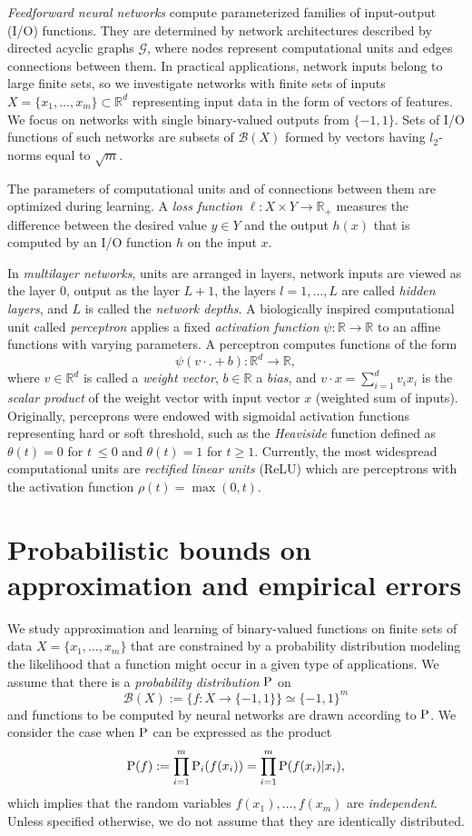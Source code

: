 \documentclass{elsarticle}
\def\n{\noindent}
\def\P{{\rm P}}
\def\cG{{\mathcal G}}
\def\cB{{\mathcal B}}
\def\bR{{\mathbb R}}
\def\n{\noindent}
\begin{document}
{\em Feedforward neural networks} compute parameterized families of input-output (I/O) functions.  They are  determined by network architectures described by directed acyclic graphs $\cG$, where nodes represent computational units and edges connections between them. In practical applications, network inputs belong to large finite sets, so we investigate networks with finite sets of inputs $X =\{x_1, \dots, x_m\}  \subset \bR^d$ representing input data in the form of vectors of features. We focus on networks with single binary-valued outputs from $\{-1,1\}$.
Sets of I/O functions of such networks are subsets of $\cB(X)$ formed by vectors having $l_2$-norms equal to $\sqrt{m}$.

The parameters of computational units and of connections between them are optimized during learning.
A {\em loss function} $\ell: X \times Y \to \bR_+$  measures the difference between the desired value $y \in Y$ and the output $h(x)$ that is computed  by an I/O function $h$ on the input $x$.

In {\em multilayer networks}, units are arranged in layers, network inputs are viewed as the layer $0$, output as the layer $L+1$,  the layers $l=1, \dots, L$ are called {\em hidden layers}, and $L$ is called the {\em network depths}.
A biologically inspired computational unit called {\em perceptron}  applies  a fixed {\em activation function}  $\psi: \bR \to \bR$ to an affine functions with varying parameters. A perceptron computes functions of the form
$$\psi(v \cdot . +b): \bR^d \to \bR,$$
\n where $v \in \bR^d$ is called a {\em weight vector}, $b \in \bR$ a {\em bias}, and $v \cdot x = \sum_{i=1}^d v_i x_i$ is the {\em scalar product} of the weight vector with input vector $x$ (weighted sum of inputs). Originally, perceprons were endowed with sigmoidal activation functions representing hard or soft threshold, such as the {\em Heaviside} function defined as  $\theta(t) = 0$ for $t\ \le 0$ and $\theta(t) =1$ for $t \geq 1$. Currently, the most widespread computational units are {\em rectified linear units} (ReLU) which are perceptrons with the activation function $\rho(t) = \max(0,t)$.


\section{Probabilistic bounds on approximation and empirical errors}
\label{sec:prob}

We study approximation and learning of binary-valued functions on finite sets of data $X = \{x_1, \dots, x_m\}$ that are constrained by a probability distribution modeling the likelihood that a function might occur in a given type of applications. We assume that there is a {\em probability distribution} ${\P}$ on
$$\cB(X) := \{ f: X \to \{-1,1\} \}\simeq \{-1,1\}^m$$
 \n  and functions to be computed by neural networks are drawn according to $\P$. We consider the case when $\P$ can be expressed as the product
$$\P(f) := \prod_{i=1}^m \P_i (f(x_i)) =  \prod_{i=1}^m \P(f(x_i)|x_i),$$
\n which implies that the random variables $f(x_1), \dots, f(x_m)$ are {\em independent}. Unless specified otherwise, we do not assume that they are identically distributed.
\end{document}
